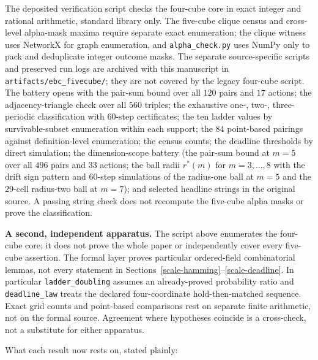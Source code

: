 \documentclass[10pt,twocolumn]{article}
\theoremstyle{plain}
\theoremstyle{definition}
\theoremstyle{remark}
\begin{document}
The deposited verification script checks the four-cube core in exact
integer and rational arithmetic, standard library only. The five-cube
clique census and cross-level alpha-mask maxima require separate exact
enumeration; the clique witness uses NetworkX for graph enumeration,
and \texttt{alpha\_check.py} uses NumPy only to pack and deduplicate
integer outcome masks. The separate source-specific scripts and preserved run logs are archived with this manuscript in \texttt{artifacts/ebc\_fivecube/}; they are not covered by the legacy four-cube script. The battery opens with the pair-sum bound over all \(120\) pairs and \(17\) actions; the
adjacency-triangle check over all \(560\) triples; the exhaustive
one-, two-, three-periodic classification with \(60\)-step
certificates; the ten ladder values by survivable-subset enumeration
within each support; the \(84\) point-based pairings against
definition-level enumeration; the census counts; the deadline
thresholds by direct simulation; the dimension-scope battery (the
pair-sum bound at \(m = 5\) over all \(496\) pairs and \(33\)
actions; the ball radii \(r^{*}(m)\) for \(m = 3, \dots, 8\) with
the drift sign pattern and \(60\)-step simulations of the radius-one
ball at \(m = 5\) and the \(29\)-cell radius-two ball at
\(m = 7\)); and selected headline strings in the original source. A passing
string check does not recompute the five-cube alpha masks or prove the
classification.

\textbf{A second, independent apparatus.} The script above enumerates the four-cube core; it does not prove
the whole paper or independently cover every five-cube assertion. The formal layer proves particular ordered-field combinatorial
lemmas, not every statement in Sections~\ref{scale-hamming}--\ref{scale-deadline}.
In particular \texttt{ladder\_doubling} assumes an already-proved
probability ratio and \texttt{deadline\_law} treats the declared
four-coordinate hold-then-matched sequence. Exact grid counts and
point-based comparisons rest on separate finite arithmetic, not on
the formal source. Agreement where hypotheses coincide is a
cross-check, not a substitute for either apparatus.

What each result now rests on, stated plainly:
\end{document}
